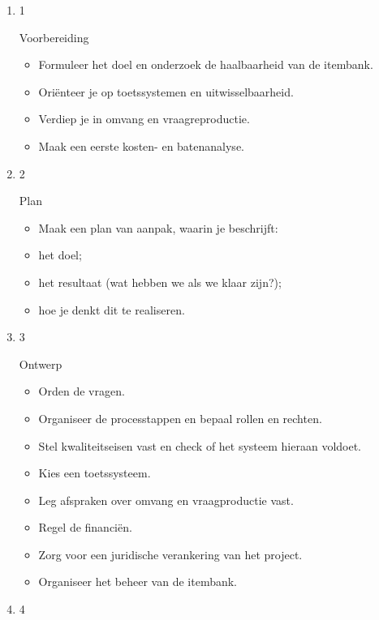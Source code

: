 \documentclass[
]{book}
\providecommand{\tightlist}{%
  \setlength{\itemsep}{0pt}\setlength{\parskip}{0pt}}
\begin{document}
\begin{enumerate}
\def\labelenumi{\arabic{enumi}.}
\item
  1

  Voorbereiding

  \begin{itemize}
  \tightlist
  \item
    Formuleer het doel en onderzoek de haalbaarheid van de itembank.\\
  \item
    Oriënteer je op toetssystemen en uitwisselbaarheid.\\
  \item
    Verdiep je in omvang en vraagreproductie.\\
  \item
    Maak een eerste kosten- en batenanalyse.\\
  \end{itemize}
\item
  2

  Plan

  \begin{itemize}
  \tightlist
  \item
    Maak een plan van aanpak, waarin je beschrijft:\\
  \item
    het doel;\\
  \item
    het resultaat (wat hebben we als we klaar zijn?);\\
  \item
    hoe je denkt dit te realiseren.\\
  \end{itemize}
\item
  3

  Ontwerp

  \begin{itemize}
  \tightlist
  \item
    Orden de vragen.\\
  \item
    Organiseer de processtappen en bepaal rollen en rechten.
  \item
    Stel kwaliteitseisen vast en check of het systeem hieraan voldoet.\\
  \item
    Kies een toetssysteem.\\
  \item
    Leg afspraken over omvang en vraagproductie vast.\\
  \item
    Regel de financiën.\\
  \item
    Zorg voor een juridische verankering van het project.\\
  \item
    Organiseer het beheer van de itembank.\\
  \end{itemize}
\item
  4


\end{enumerate}
\end{document}
